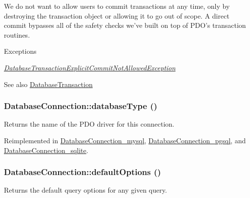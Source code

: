 We do not want to allow users to commit transactions at any time, only by destroying the transaction object or allowing it to go out of scope. A direct commit bypasses all of the safety checks we've built on top of PDO's transaction routines.


\begin{DoxyExceptions}{Exceptions}
\item[{\em \hyperlink{classDatabaseTransactionExplicitCommitNotAllowedException}{DatabaseTransactionExplicitCommitNotAllowedException}}]\end{DoxyExceptions}
\begin{DoxySeeAlso}{See also}
\hyperlink{classDatabaseTransaction}{DatabaseTransaction} 
\end{DoxySeeAlso}
\hypertarget{classDatabaseConnection_a7dd7e76bc813c6a90a6d26a5529d67b0}{
\subsubsection[{databaseType}]{\setlength{\rightskip}{0pt plus 5cm}DatabaseConnection::databaseType ()}}
\label{classDatabaseConnection_a7dd7e76bc813c6a90a6d26a5529d67b0}
Returns the name of the PDO driver for this connection. 

Reimplemented in \hyperlink{classDatabaseConnection__mysql_a983f8932fcaa5f3806c78e28841e7a5b}{DatabaseConnection\_\-mysql}, \hyperlink{classDatabaseConnection__pgsql_ad8e8147530abb85983d9cfdce5d0808c}{DatabaseConnection\_\-pgsql}, and \hyperlink{classDatabaseConnection__sqlite_acafbe944024f6bbdf26c11dab3c6b534}{DatabaseConnection\_\-sqlite}.\hypertarget{classDatabaseConnection_a190539d6c494ef2d7ac90d21226de5a5}{
\subsubsection[{defaultOptions}]{\setlength{\rightskip}{0pt plus 5cm}DatabaseConnection::defaultOptions ()}}
\label{classDatabaseConnection_a190539d6c494ef2d7ac90d21226de5a5}
Returns the default query options for any given query.

